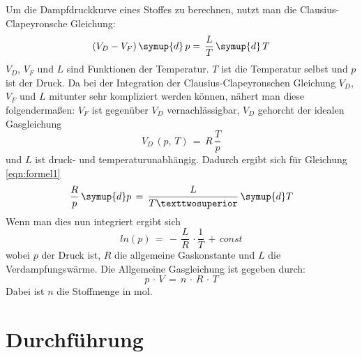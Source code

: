 \documentclass[
  bibliography=totoc,     %
  captions=tableheading,  %
  titlepage=firstiscover, %
]{scrartcl}
\begin{document}
Um die Dampfdruckkurve eines Stoffes zu berechnen, nutzt man die Clausius-Clapeyronsche Gleichung:
\begin{equation}
  (V_D-V_F)\,\symup{d}\,p=\,\frac{L}{T}\,\symup{d}\,T
  \label{eqn:formel1}
\end{equation}
$V_D$, $V_F$ und $L$ sind Funktionen der Temperatur. $T$ ist die Temperatur
selbst und $p$ ist der Druck. Da bei der Integration der Clausius-Clapeyronschen
Gleichung $V_D$, $V_F$ und $L$ mitunter sehr kompliziert werden können, nähert
man diese folgendermaßen:
$V_F$ ist gegenüber $V_D$ vernachlässigbar, $V_D$ gehorcht der idealen
Gasgleichung
\begin{equation}
  V_D\,(p,\,T)\,=\,R\,\frac{T}{p}
  \label{eqn:formel2}
\end{equation}
und $L$ ist druck- und temperaturunabhängig. Dadurch ergibt sich für Gleichung
\eqref{eqn:formel1}
\begin{equation}
  \frac{R}{p}\,\symup{d}p\,=\,\frac{L}{T²}\,\symup{d}T
  \label{eqn:formel3}
\end{equation}
Wenn man dies nun integriert ergibt sich
\begin{equation}
  ln \left( p \right)\,=\,-\,\frac{L}{R}\,\cdot\frac{1}{T}\,+\,const
  \label{eqn:formel4}
\end{equation}
wobei $p$ der Druck ist, $R$ die allgemeine Gaskonstante und $L$
die Verdampfungswärme.
Die Allgemeine Gasgleichung ist gegeben durch:
\begin{equation}
  p\,\cdot\,V\,=\,n\,\cdot\,R\,\cdot\,T
  \label{eqn:formel5}
\end{equation}
Dabei ist $n$ die Stoffmenge in $\si{\mol}$.
\newpage
\section{Durchführung}
\label{sec:durchführung}
\end{document}
